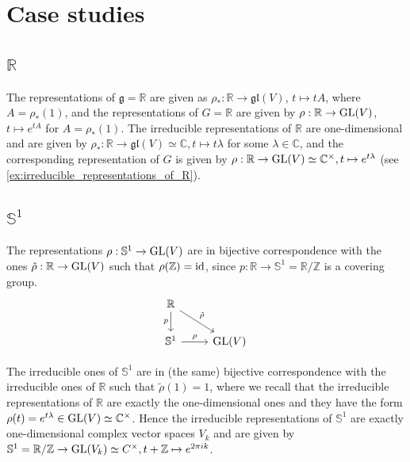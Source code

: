 \documentclass{report}
\begin{document}
\chapter{Case studies}
\section{$\mathbb R$}
The representations of $\mathfrak g = \mathbb R$ are given as $\rho_*: \mathbb R \to \mathfrak{gl}(V)$, $t \mapsto t A$, where $A = \rho_*(1)$, and the representations of $G = \mathbb R$ are given by $\rho: \mathbb R \to \operatorname{{\mathrm{GL}}}(V)$, $t \mapsto e^{tA}$ for $A = \rho_*(1)$.
The irreducible representations of $\mathbb R$ are one-dimensional and are given by $\rho_*: \mathbb R \to \mathfrak{gl}(V) \simeq \mathbb C, t \mapsto t \lambda$ for some $\lambda \in \mathbb C$, and the corresponding representation of $G$ is given by $\rho: \mathbb R \to \operatorname{{\mathrm{GL}}}(V) \simeq \mathbb C^{\times}, t \mapsto e^{t \lambda}$ (see \cref{ex:irreducible_representations_of_R}).
\section{$\mathbb S^1$}
The representations $\rho:\mathbb S^1 \to \operatorname{{\mathrm{GL}}}(V)$ are in bijective correspondence with the ones $\tilde \rho: \mathbb R \to \operatorname{{\mathrm{GL}}}(V)$ such that $\rho(\mathbb Z) = \operatorname{id}$, since $p: \mathbb R \to \mathbb S^1 = \mathbb R / \mathbb Z$ is a covering group.
\[
    \begin{tikzcd}
        \mathbb R \arrow[dr, "\tilde \rho"] \arrow[d, "p"']  \\
        \mathbb S^1 \arrow[r, "\rho"] & \GL(V)
    \end{tikzcd}
\]

The irreducible ones of $\mathbb S^1$ are in (the same) bijective correspondence with the irreducible ones of $\mathbb R$ such that $\tilde \rho(1) = 1$, where we recall that the irreducible representations of $\mathbb R$ are exactly the one-dimensional ones and they have the form $\rho(t) = e^{t \lambda} \in \operatorname{{\mathrm{GL}}}(V) \simeq \mathbb C^{\times}$.
Hence the irreducible representations of $\mathbb S^1$ are exactly one-dimensional complex vector spaces $V_k$ and are given by $\mathbb S^1 = \mathbb R/ \mathbb Z \to \operatorname{{\mathrm{GL}}}(V_k) \simeq C^{\times}, t + \mathbb Z \mapsto e^{2 \pi i k }$.
\end{document}
